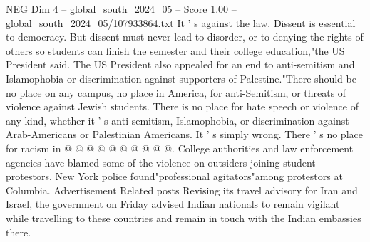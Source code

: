 \begin{textsample}{NEG Dim 4 – global\_south\_2024\_05 – Score 1.00 – global\_south\_2024\_05/107933864.txt}
It ' s against the law.
Dissent is essential to democracy.
But dissent must never lead to disorder, or to denying the rights of others so students can finish the semester and their college education,"the US President said.
The US President also appealed for an end to anti-semitism and Islamophobia or discrimination against supporters of Palestine."There should be no place on any campus, no place in America, for anti-Semitism, or threats of violence against Jewish students.
There is no place for hate speech or violence of any kind, whether it ' s anti-semitism, Islamophobia, or discrimination against Arab-Americans or Palestinian Americans.
It ' s simply wrong.
There ' s no place for racism in @ @ @ @ @ @ @ @ @ @.
College authorities and law enforcement agencies have blamed some of the violence on outsiders joining student protestors.
New York police found"professional agitators"among protestors at Columbia.
Advertisement Related posts Revising its travel advisory for Iran and Israel, the government on Friday advised Indian nationals to remain vigilant while travelling to these countries and remain in touch with the Indian embassies there.

\end{textsample}
